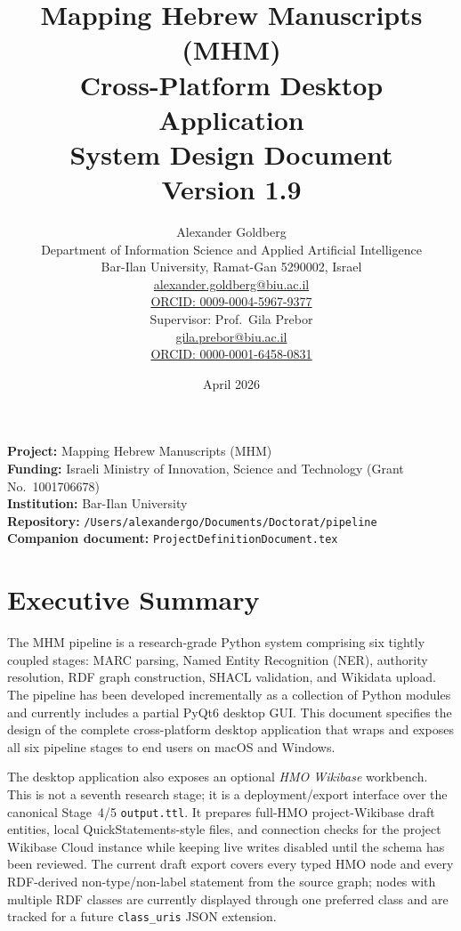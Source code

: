 \documentclass[12pt]{article}
\title{%
  \vspace{-1cm}
  {\LARGE\bfseries Mapping Hebrew Manuscripts (MHM)}\\[0.5cm]
  {\LARGE\bfseries Cross-Platform Desktop Application}\\[0.5cm]
  {\Large System Design Document}\\[1cm]
  {\large Version 1.9}
}
\author{
  Alexander Goldberg\\
  Department of Information Science and Applied Artificial Intelligence\\
  Bar-Ilan University, Ramat-Gan 5290002, Israel\\[4pt]
  \href{mailto:alexander.goldberg@biu.ac.il}{alexander.goldberg@biu.ac.il}\\
  \href{https://orcid.org/0009-0004-5967-9377}{ORCID: 0009-0004-5967-9377}\\[0.5cm]
  Supervisor: Prof.\ Gila Prebor\\
  \href{mailto:gila.prebor@biu.ac.il}{gila.prebor@biu.ac.il}\\
  \href{https://orcid.org/0000-0001-6458-0831}{ORCID: 0000-0001-6458-0831}
}
\date{April 2026}
\newcommand{\filepath}[1]{\texttt{\small #1}}
\newcommand{\code}[1]{\texttt{#1}}
\begin{document}
\maketitle
\thispagestyle{empty}

\vfill
\noindent\textbf{Project:} Mapping Hebrew Manuscripts (MHM)\\
\textbf{Funding:} Israeli Ministry of Innovation, Science and Technology (Grant No.\ 1001706678)\\
\textbf{Institution:} Bar-Ilan University\\
\textbf{Repository:} \filepath{/Users/alexandergo/Documents/Doctorat/pipeline}\\
\textbf{Companion document:} \filepath{ProjectDefinitionDocument.tex}

\newpage
\tableofcontents
\newpage
\listoffigures
\listoftables
\newpage

\section{Executive Summary}
\label{sec:executive-summary}

The MHM pipeline is a research-grade Python system comprising six tightly coupled stages: MARC parsing, Named Entity Recognition (NER), authority resolution, RDF graph construction, SHACL validation, and Wikidata upload. The pipeline has been developed incrementally as a collection of Python modules and currently includes a partial PyQt6 desktop GUI. This document specifies the design of the complete cross-platform desktop application that wraps and exposes all six pipeline stages to end users on macOS and Windows.

The desktop application also exposes an optional \emph{HMO Wikibase} workbench. This is not a seventh research stage; it is a deployment/export interface over the canonical Stage~4/5 \code{output.ttl}. It prepares full-HMO project-Wikibase draft entities, local QuickStatements-style files, and connection checks for the project Wikibase Cloud instance while keeping live writes disabled until the schema has been reviewed. The current draft export covers every typed HMO node and every RDF-derived non-type/non-label statement from the source graph; nodes with multiple RDF classes are currently displayed through one preferred class and are tracked for a future \code{class\_uris} JSON extension.
\end{document}
